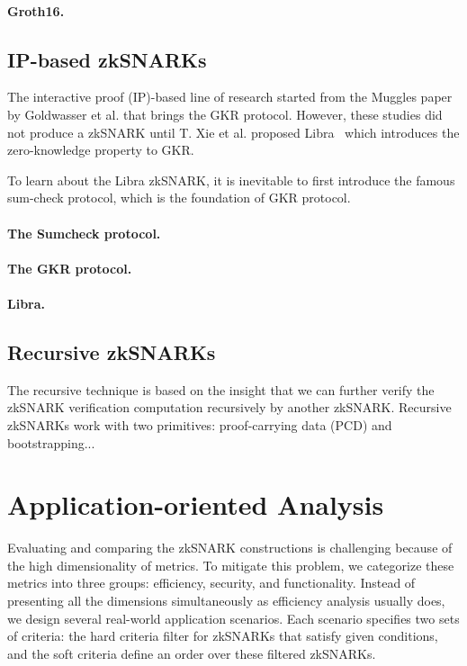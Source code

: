 \documentclass[acmtog]{acmart}
\begin{document}
\paragraph{Groth16.}

\subsection{IP-based zkSNARKs}

The interactive proof (IP)-based line of research started from the Muggles paper~\cite{GoldwasserKR08} by Goldwasser et al. that brings the GKR protocol.
However, these studies did not produce a zkSNARK until T. Xie et al. proposed Libra~\cite{XieZZPS19} which introduces the zero-knowledge property to GKR.

To learn about the Libra zkSNARK, it is inevitable to first introduce the famous sum-check protocol, which is the foundation of GKR protocol.

\paragraph{The Sumcheck protocol.}

\paragraph{The GKR protocol.}

\paragraph{Libra.}

\subsection{Recursive zkSNARKs}

The recursive technique is based on the insight that we can further verify the zkSNARK verification computation recursively by another zkSNARK.
Recursive zkSNARKs work with two primitives: proof-carrying data (PCD) and bootstrapping...

\section{Application-oriented Analysis}

Evaluating and comparing the zkSNARK constructions is challenging because of the high dimensionality of metrics.
To mitigate this problem, we categorize these metrics into three groups: efficiency, security, and functionality.
Instead of presenting all the dimensions simultaneously as efficiency analysis usually does, we design several real-world application scenarios.
Each scenario specifies two sets of criteria: the hard criteria filter for zkSNARKs that satisfy given conditions, and the soft criteria define an order over these filtered zkSNARKs.
\end{document}
